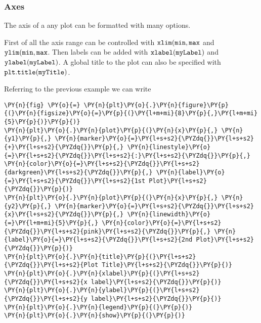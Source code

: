    \hypertarget{axes}{%
\subsubsection{Axes}\label{axes}}

The axis of a any plot can be formatted with many options.

First of all the axis range can be controlled with
\(\tt{xlim(min, max}\) and \(\tt{ylim(min, max}\). Then labels can be
added with \(\tt{xlabel(myLabel)}\) and \(\tt{ylabel(myLabel)}\). A
global title to the plot can also be specified with
\(\tt{plt.title(myTitle)}\).

Referring to the previous example we can write

    \begin{tcolorbox}[breakable, size=fbox, boxrule=1pt, pad at break*=1mm,colback=cellbackground, colframe=cellborder]
\begin{Verbatim}[commandchars=\\\{\}]
\PY{n}{fig} \PY{o}{=} \PY{n}{plt}\PY{o}{.}\PY{n}{figure}\PY{p}{(}\PY{n}{figsize}\PY{o}{=}\PY{p}{(}\PY{l+m+mi}{8}\PY{p}{,}\PY{l+m+mi}{5}\PY{p}{)}\PY{p}{)}
\PY{n}{plt}\PY{o}{.}\PY{n}{plot}\PY{p}{(}\PY{n}{x}\PY{p}{,} \PY{n}{y1}\PY{p}{,} \PY{n}{marker}\PY{o}{=}\PY{l+s+s2}{\PYZdq{}}\PY{l+s+s2}{+}\PY{l+s+s2}{\PYZdq{}}\PY{p}{,} \PY{n}{linestyle}\PY{o}{=}\PY{l+s+s2}{\PYZdq{}}\PY{l+s+s2}{:}\PY{l+s+s2}{\PYZdq{}}\PY{p}{,} \PY{n}{color}\PY{o}{=}\PY{l+s+s2}{\PYZdq{}}\PY{l+s+s2}{darkgreen}\PY{l+s+s2}{\PYZdq{}}\PY{p}{,} \PY{n}{label}\PY{o}{=}\PY{l+s+s2}{\PYZdq{}}\PY{l+s+s2}{1st Plot}\PY{l+s+s2}{\PYZdq{}}\PY{p}{)}
\PY{n}{plt}\PY{o}{.}\PY{n}{plot}\PY{p}{(}\PY{n}{x}\PY{p}{,} \PY{n}{y2}\PY{p}{,} \PY{n}{marker}\PY{o}{=}\PY{l+s+s2}{\PYZdq{}}\PY{l+s+s2}{x}\PY{l+s+s2}{\PYZdq{}}\PY{p}{,} \PY{n}{linewidth}\PY{o}{=}\PY{l+m+mi}{5}\PY{p}{,} \PY{n}{color}\PY{o}{=}\PY{l+s+s2}{\PYZdq{}}\PY{l+s+s2}{pink}\PY{l+s+s2}{\PYZdq{}}\PY{p}{,} \PY{n}{label}\PY{o}{=}\PY{l+s+s2}{\PYZdq{}}\PY{l+s+s2}{2nd Plot}\PY{l+s+s2}{\PYZdq{}}\PY{p}{)}
\PY{n}{plt}\PY{o}{.}\PY{n}{title}\PY{p}{(}\PY{l+s+s2}{\PYZdq{}}\PY{l+s+s2}{Plot Title}\PY{l+s+s2}{\PYZdq{}}\PY{p}{)}
\PY{n}{plt}\PY{o}{.}\PY{n}{xlabel}\PY{p}{(}\PY{l+s+s2}{\PYZdq{}}\PY{l+s+s2}{x label}\PY{l+s+s2}{\PYZdq{}}\PY{p}{)}
\PY{n}{plt}\PY{o}{.}\PY{n}{ylabel}\PY{p}{(}\PY{l+s+s2}{\PYZdq{}}\PY{l+s+s2}{y label}\PY{l+s+s2}{\PYZdq{}}\PY{p}{)}
\PY{n}{plt}\PY{o}{.}\PY{n}{legend}\PY{p}{(}\PY{p}{)}
\PY{n}{plt}\PY{o}{.}\PY{n}{show}\PY{p}{(}\PY{p}{)}
\end{Verbatim}
\end{tcolorbox}

